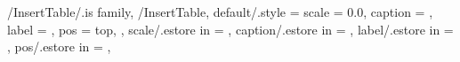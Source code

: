 %
%
%
%
%


\pgfkeys
{
  /InsertTable/.is family, /InsertTable,
  default/.style =
  {
    scale = 0.0,
    caption = \empty,
    label = \empty,
    pos = top, %
  },
  scale/.estore in = \TmpValueScale,
  caption/.estore in = \TmpValueCaption,
  label/.estore in = \TmpValueLabel,
  pos/.estore in = \TmpValuePosition,
} %

\newcommand{\DisplayTableContent}[2][\empty]
{
  \ifthenelse{\equal{#1}{0.0}}%
  {%
    \begin{minipage}[c]{\textwidth}
    \colorbox{white}{\makebox[\textwidth]{#2}}
    \end{minipage}
  }{%
    \begin{minipage}[c]{\textwidth}
    \colorbox{white}{\makebox[\textwidth]{%
    \resizebox{#1\paperwidth}{!}{#2}}}
    \end{minipage}
  }%
} %

\newcommand{\InsertTable}[2][\empty]
{
  \pgfkeys{/InsertTable, default, #1}%
  \begin{table}[H]
    \ifthenelse{\equal{\TmpValuePosition}{top}}%
    {%
      \SetImageCaptionAndLabel{\TmpValueCaption}{\TmpValueLabel}%
      \DisplayTableContent[\TmpValueScale]{#2}%
    }{%
      \DisplayTableContent[\TmpValueScale]{#2}%
      \SetImageCaptionAndLabel{\TmpValueCaption}{\TmpValueLabel}%
    }%
  \end{table}
} %

